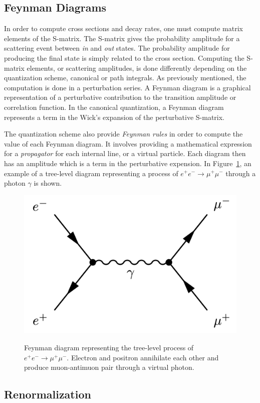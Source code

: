 \subsection{Feynman Diagrams}

In order to compute cross sections and decay rates, one must compute matrix elements of the S-matrix. The S-matrix gives the probability amplitude for a scattering event between \emph{in} and \emph{out} states. The probability amplitude for producing the final state is simply related to the cross section. Computing the S-matrix elements, or scattering amplitudes, is done differently depending on the quantization scheme, canonical or path integrals. As previously mentioned, the computation is done in a perturbation series. A Feynman diagram is a graphical representation of a perturbative contribution to the transition amplitude or correlation function. In the canonical quantization, a Feynman diagram represents a term in the Wick's expansion of the perturbative S-matrix. 

The quantization scheme also provide \emph{Feynman rules} in order to compute the value of each Feynman diagram. It involves providing a mathematical expression for a \emph{propagator} for each internal line, or a virtual particle. Each diagram then has an amplitude which is a term in the perturbative expension. In Figure~\ref{fig:e-to-mu-feynman}, an example of a tree-level diagram representing a process of $e^+ e^- \rightarrow \mu^+ \mu^-$ through a photon $\gamma$ is shown.

\begin{figure}[!htb]
\centering
\includegraphics[width=0.5\linewidth]{plots/feynman_diagrams/feynman_e_to_mu.png}  \\
\caption[Electrons to Muons Feynman diagram]{Feynman diagram representing the tree-level process of $e^+ e^- \rightarrow \mu^+ \mu^-$. Electron and positron annihilate each other and produce muon-antimuon pair through a virtual photon.}
\label{fig:e-to-mu-feynman}
\end{figure}

\subsection{Renormalization}

